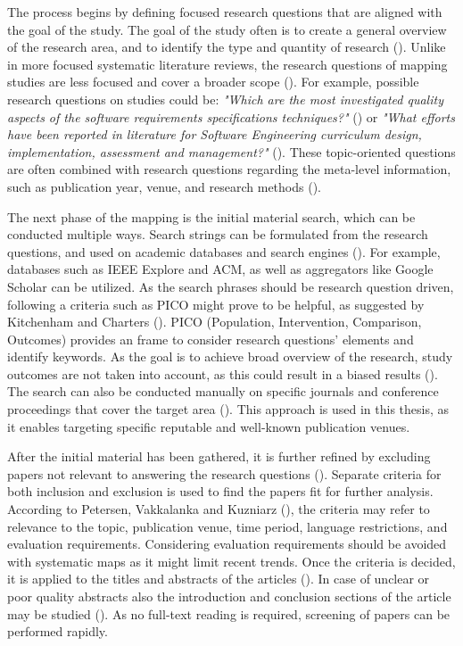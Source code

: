 \documentclass[utf8,english]{gradu3}
\begin{document}
The process begins by defining focused research questions that are aligned with
the goal of the study. The goal of the study often is to create a general
overview of the research area, and to identify the type and quantity of research
(\cite{petersen2008}). Unlike in more focused systematic literature reviews, the
research questions of mapping studies are less focused and cover a broader scope
(\cite{kitchenham2010}). For example, possible research questions on studies
could be: \emph{"Which are the most investigated quality aspects of the software
  requirements specifications techniques?"} (\cite{condori2009}) or \emph{"What
  efforts have been reported in literature for Software Engineering curriculum
  design, implementation, assessment and management?"} (\cite{qadir2011}). These
topic-oriented questions are often combined with research questions regarding
the meta-level information, such as publication year, venue, and research
methods (\cite{petersen2015}).

The next phase of the mapping is the initial material search, which can be
conducted multiple ways. Search strings can be formulated from the research
questions, and used on academic databases and search engines
(\cite{petersen2008}). For example, databases such as IEEE Explore and ACM, as
well as aggregators like Google Scholar can be utilized. As the search phrases
should be research question driven, following a criteria such as PICO might
prove to be helpful, as suggested by Kitchenham and Charters
(\cite*{kitchenham2007}). PICO (Population, Intervention, Comparison, Outcomes)
provides an frame to consider research questions' elements and identify
keywords. As the goal is to achieve broad overview of the research, study
outcomes are not taken into account, as this could result in a biased results
(\cite{petersen2008}). The search can also be conducted manually on specific
journals and conference proceedings that cover the target area
(\cite{petersen2008}). This approach is used in this thesis, as it enables
targeting specific reputable and well-known publication venues.

After the initial material has been gathered, it is further refined by excluding
papers not relevant to answering the research questions (\cite{petersen2008}).
Separate criteria for both inclusion and exclusion is used to find the papers
fit for further analysis. According to Petersen, Vakkalanka and Kuzniarz
(\cite*{petersen2015}), the criteria may refer to relevance to the topic,
publication venue, time period, language restrictions, and evaluation
requirements. Considering evaluation requirements should be avoided with
systematic maps as it might limit recent trends. Once the criteria is decided,
it is applied to the titles and abstracts of the articles (\cite{petersen2015}).
In case of unclear or poor quality abstracts also the introduction and
conclusion sections of the article may be studied (\cite{petersen2008}). As no
full-text reading is required, screening of papers can be performed rapidly.
\end{document}
